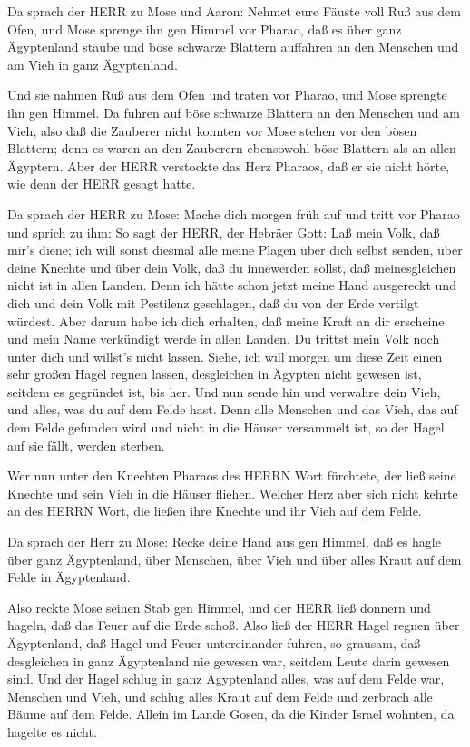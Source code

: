  Da sprach der HERR zu Mose und Aaron: Nehmet eure Fäuste
voll Ruß aus dem Ofen, und Mose sprenge ihn gen Himmel vor Pharao,
 daß es über ganz Ägyptenland stäube und böse schwarze
Blattern auffahren an den Menschen und am Vieh in ganz Ägyptenland.

 Und sie nahmen Ruß aus dem Ofen und traten vor Pharao, und
Mose sprengte ihn gen Himmel. Da fuhren auf böse schwarze Blattern an
den Menschen und am Vieh,  also daß die Zauberer nicht
konnten vor Mose stehen vor den bösen Blattern; denn es waren an den
Zauberern ebensowohl böse Blattern als an allen Ägyptern. 
Aber der HERR verstockte das Herz Pharaos, daß er sie nicht hörte, wie
denn der HERR gesagt hatte.

 Da sprach der HERR zu Mose: Mache dich morgen früh auf und
tritt vor Pharao und sprich zu ihm: So sagt der HERR, der Hebräer Gott:
Laß mein Volk, daß mir's diene;  ich will sonst diesmal
alle meine Plagen über dich selbst senden, über deine Knechte und über
dein Volk, daß du innewerden sollst, daß meinesgleichen nicht ist in
allen Landen.  Denn ich hätte schon jetzt meine Hand
ausgereckt und dich und dein Volk mit Pestilenz geschlagen, daß du von
der Erde vertilgt würdest.  Aber darum habe ich dich
erhalten, daß meine Kraft an dir erscheine und mein Name verkündigt
werde in allen Landen.  Du trittst mein Volk noch unter
dich und willst's nicht lassen.  Siehe, ich will morgen um
diese Zeit einen sehr großen Hagel regnen lassen, desgleichen in Ägypten
nicht gewesen ist, seitdem es gegründet ist, bis her.  Und
nun sende hin und verwahre dein Vieh, und alles, was du auf dem Felde
hast. Denn alle Menschen und das Vieh, das auf dem Felde gefunden wird
und nicht in die Häuser versammelt ist, so der Hagel auf sie fällt,
werden sterben.

 Wer nun unter den Knechten Pharaos des HERRN Wort
fürchtete, der ließ seine Knechte und sein Vieh in die Häuser fliehen.
 Welcher Herz aber sich nicht kehrte an des HERRN Wort, die
ließen ihre Knechte und ihr Vieh auf dem Felde.

 Da sprach der Herr zu Mose: Recke deine Hand aus gen
Himmel, daß es hagle über ganz Ägyptenland, über Menschen, über Vieh und
über alles Kraut auf dem Felde in Ägyptenland.

 Also reckte Mose seinen Stab gen Himmel, und der HERR ließ
donnern und hageln, daß das Feuer auf die Erde schoß. Also ließ der HERR
Hagel regnen über Ägyptenland,  daß Hagel und Feuer
untereinander fuhren, so grausam, daß desgleichen in ganz Ägyptenland
nie gewesen war, seitdem Leute darin gewesen sind.  Und der
Hagel schlug in ganz Ägyptenland alles, was auf dem Felde war, Menschen
und Vieh, und schlug alles Kraut auf dem Felde und zerbrach alle Bäume
auf dem Felde.  Allein im Lande Gosen, da die Kinder Israel
wohnten, da hagelte es nicht.

